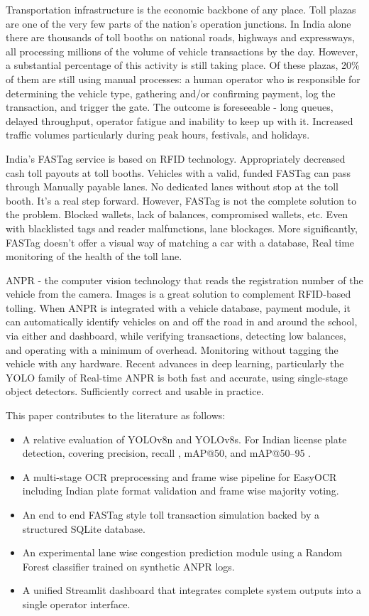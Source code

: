 \documentclass[conference]{IEEEtran}
\begin{document}
Transportation infrastructure is the economic backbone of any place. Toll plazas are one of the very few parts of the nation's operation junctions.
In India alone there are thousands of toll booths on national roads,
highways and expressways, all processing millions of
the volume of vehicle transactions by the day.
However, a substantial percentage of this activity is still taking place.
Of these plazas, 20\% of them are still using manual processes: a human operator
who is responsible for determining the vehicle type, gathering and/or confirming payment,
log the transaction, and trigger the gate.
The outcome is foreseeable - long queues, delayed throughput,
operator fatigue and inability to keep up with it.
Increased traffic volumes particularly during peak hours, festivals,
and holidays.

India's FASTag service is based on RFID technology.
Appropriately decreased cash toll payouts at toll booths.
Vehicles with a valid, funded FASTag can pass through
Manually payable lanes. No dedicated lanes without stop at the toll booth.
It's a real step forward.
However, FASTag is not the complete solution to the problem.
Blocked wallets, lack of balances, compromised wallets, etc.
Even with blacklisted tags and reader malfunctions, lane
blockages.
More significantly, FASTag doesn't offer a visual way of
matching a car with a database,
Real time monitoring of the health of the toll lane.

ANPR - the computer vision
technology that reads the registration number of the vehicle from the camera.
Images is a great solution to complement RFID-based tolling.
When ANPR is integrated with a vehicle database, payment module,
it can automatically identify vehicles on and off the road in and around the school, via either and dashboard,
while verifying transactions, detecting low balances, and operating with a minimum of overhead.
Monitoring without tagging the vehicle with any hardware.
Recent advances in deep learning, particularly the YOLO family of
Real-time ANPR is both fast and accurate, using single-stage object detectors.
Sufficiently correct and usable in practice.

This paper contributes to the literature as follows:
\begin{itemize}
  \item A relative evaluation of YOLOv8n and YOLOv8s. For Indian license plate detection, covering precision, recall , mAP@50, and mAP@50--95 .
  \item A multi-stage OCR preprocessing and frame wise pipeline for EasyOCR including Indian plate format validation and frame wise majority voting.
  \item An end to end FASTag style toll transaction simulation backed by a structured SQLite database.
  \item An experimental lane wise congestion prediction module using a Random Forest classifier trained on synthetic ANPR logs.
  \item A unified Streamlit dashboard that integrates complete system outputs into a single operator interface.
\end{itemize}
\end{document}
